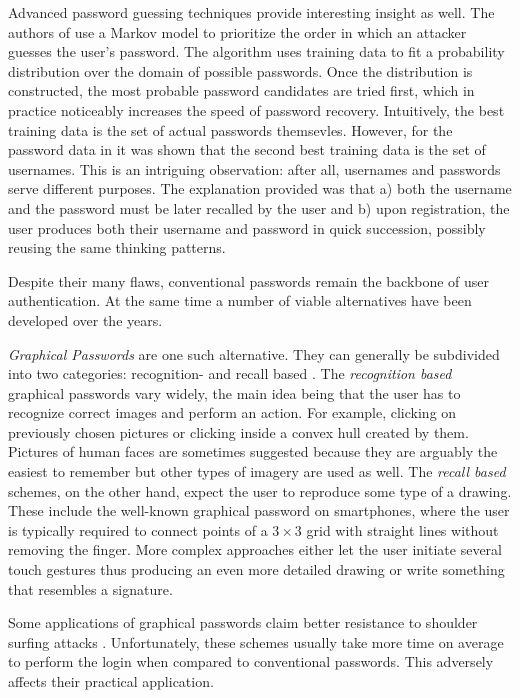 Advanced password guessing techniques provide interesting insight as well. The authors of \cite{dell:2010:password} use a Markov model to prioritize the order in which an attacker guesses the user's password. The algorithm uses training data to fit a probability distribution over the domain of possible passwords. Once the distribution is constructed, the most probable password candidates are tried first, which in practice noticeably increases the speed of password recovery. Intuitively, the best training data is the set of actual passwords themsevles. However, for the password data in \cite{dell:2010:password} it was shown that the second best training data is the set of usernames. This is an intriguing observation: after all, usernames and passwords serve different purposes. The explanation provided was that a) both the username and the password must be later recalled by the user and b) upon registration, the user produces both their username and password in quick succession, possibly reusing the same thinking patterns.

Despite their many flaws, conventional passwords remain the backbone of user authentication. At the same time a number of viable alternatives have been developed over the years.

\emph{Graphical Passwords} are one such alternative. They can generally be subdivided into two categories: recognition- and recall based \cite{suo:2005:graphical-passwords-survey}. The \emph{recognition based} graphical passwords vary widely, the main idea being that the user has to recognize correct images and perform an action. For example, clicking on previously chosen pictures or clicking inside a convex hull created by them. Pictures of human faces are sometimes suggested because they are arguably the easiest to remember but other types of imagery are used as well. The \emph{recall based} schemes, on the other hand, expect the user to reproduce some type of a drawing. These include the well-known graphical password on smartphones, where the user is typically required to connect points of a \(3 \times 3\) grid with straight lines without removing the finger. More complex approaches either let the user initiate several touch gestures thus producing an even more detailed drawing or write something that resembles a signature.

Some applications of graphical passwords claim better resistance to shoulder surfing attacks \cite{suo:2005:graphical-passwords-survey}. Unfortunately, these schemes usually take more time on average to perform the login when compared to conventional passwords. This adversely affects their practical application.

